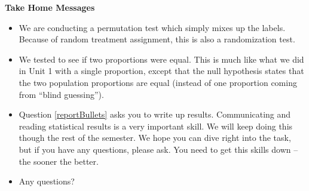 \newpage
\begin{center}
  {\bf Take Home Messages}
\end{center}
  \begin{itemize}
  \item We are conducting a permutation test which simply mixes up the
    labels.  Because of random treatment assignment, this is also a
    randomization test. 
  \item We tested to see if  two proportions were
    equal. This is much like what we did in Unit 1 with a single
    proportion, except that the null hypothesis states that the two
    population proportions are equal (instead of one proportion coming
    from ``blind guessing'').
  \item Question \ref{reportBullets} asks you to write up results.
    Communicating 
    and reading statistical results is a very important skill.  We
    will keep doing this though the rest of the semester.  We hope you
    can dive right into the task, but if you have any questions,
    please ask.  You need to get this skills down -- the sooner the
    better. 
 \item 
 Any questions?
  \end{itemize}



